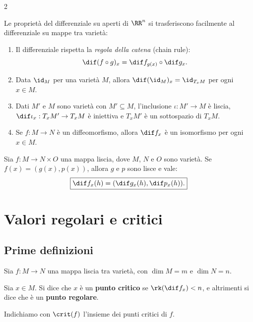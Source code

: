 \begin{multicols*}{2}
    \begin{remark}
        Le proprietà del differenziale su aperti di $\RR^n$ si trasferiscono
        facilmente al differenziale su mappe tra varietà:
        \begin{enumerate}[(i.)]
            \item Il differenziale rispetta la \textit{regola della catena} (chain rule):
                  \[ \dif(f \circ g)_x = \dif f_{g(x)} \circ \dif g_x. \]
            \item Data $\id_M$ per una varietà $M$, allora $\dif (\id_M)_x = \id_{T_x M}$ per ogni $x \in M$.
            \item Dati $M'$ e $M$ sono varietà con $M' \subseteq M$, l'inclusione $\iota : M' \to M$ è liscia,
                  $\dif \iota_x : T_x M' \to T_x M$ è iniettiva e $T_x M'$ è un sottospazio di $T_x M$.
            \item Se $f : M \to N$ è un diffeomorfismo, allora $\dif f_x$ è un isomorfismo per ogni $x \in M$.
        \end{enumerate}
    \end{remark}

    \begin{proposition} \label{prop:diff_prodotto}
        Sia $f : M \to N \times O$ una mappa liscia, dove $M$, $N$ e $O$ sono varietà.
        Se $f(x) = (g(x), p(x))$, allora $g$ e $p$ sono lisce e vale:
        \[
            \boxed{\dif f_x(h) = (\dif g_x(h), \dif p_x(h)).}
        \]
    \end{proposition}

    \section{Valori regolari e critici}

    \subsection{Prime definizioni}

    \begin{definition}
        Sia $f : M \to N$ una mappa liscia tra varietà, con
        $\dim M = m$ e $\dim N = n$. \smallskip

        Sia $x \in M$. Si dice che $x$ è un \textbf{punto critico}
        se $\rk(\dif f_x) < n$, e altrimenti si dice che è un
        \textbf{punto regolare}. \smallskip

        Indichiamo con $\crit(f)$ l'insieme dei punti critici di
        $f$.
    \end{definition}


\end{multicols*}
